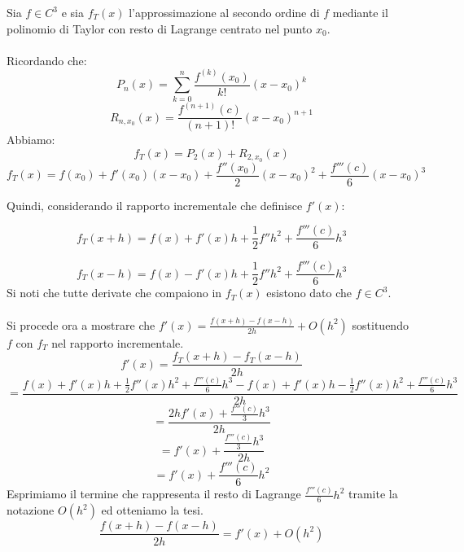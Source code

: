 \begin{center}
\footnotesize\noindent{}\end{center}

\noindent Sia \(f \in C^3\) e sia \(f_T(x)\) l'approssimazione al secondo ordine di \(f\) mediante il polinomio di Taylor con resto di Lagrange centrato nel punto \(x_0\).
\\
\\
\noindent Ricordando che:
\[
P_n(x) = \sum_{k=0}^n{ \frac{f^{(k)} (x_0)}{k!}(x-x_0)^k}
\]
\[
R_{n,x_0}(x) = \frac{f^{(n+1)}(c)}{(n+1)!}(x-x_0)^{n+1}
\]
\noindent Abbiamo:
\[
f_T(x) = P_2(x) + R_{2, x_0}(x)
\]
\[
f_T(x) = f(x_0) + f'(x_0)(x-x_0) + \frac{f''(x_0)}{2}(x-x_0)^2 + \frac{f'''(c)}{6}(x-x_0)^3
\]

\noindent Quindi, considerando il rapporto incrementale che definisce \(f'(x)\):

\[
f_T(x + h) = f(x) + f'(x)h + \frac{1}{2} f''h^2 + \frac{f'''(c)}{6}h^3
\]

\[
f_T(x - h) = f(x) - f'(x)h + \frac{1}{2} f''h^2 + \frac{f'''(c)}{6}h^3
\]
\noindent Si noti che tutte derivate che compaiono in \(f_T(x)\) esistono dato che \(f \in C^3\).
\\
\\
\noindent Si procede ora a mostrare che \(f'(x) = \frac{f(x+h)-f(x-h)}{2h} + O(h^2)\) sostituendo \(f\) con \(f_T\) nel rapporto incrementale.
\\
\[
f'(x) = \frac{f_T(x + h) - f_T(x - h)}{2h}
\]
\[
= \frac{
	f(x) + f'(x)h + \frac{1}{2} f''(x)h^2 + \frac{f'''(c)}{6}h^3
	-
	f(x) + f'(x)h - \frac{1}{2} f''(x)h^2 + \frac{f'''(c)}{6}h^3
}{2h}
\]
\[
= \frac{2hf'(x) + \frac{f'''(c)}{3}h^3}{2h}
\]
\[
= f'(x) + \frac{\frac{f'''(c)}{3}h^3}{2h}
\]
\[
= f'(x) + \frac{f'''(c)}{6}h^2
\]
\noindent Esprimiamo il termine che rappresenta il resto di Lagrange \(\frac{f'''(c)}{6}h^2\) tramite la notazione \(O(h^2)\) ed otteniamo la tesi.
\[
\frac{f(x+h)-f(x-h)}{2h} = f'(x) + O(h^2)
\]
